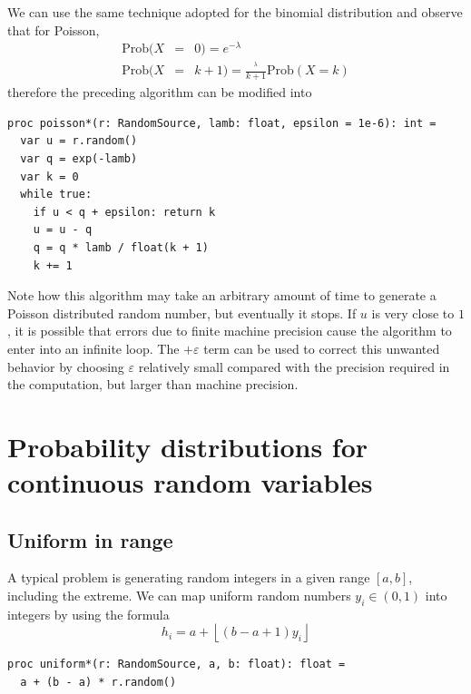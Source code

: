 \documentclass[justified, sixbynine]{tufte-book}
\def\ft{\small\tt}
\theoremstyle{plain}%
\newtheorem * {corollary}{Corollary}
\theoremstyle{definition}
\theoremstyle{remark}
\newtheorem * {remark}{Remark}
\newtheorem * {note}{Note}
\begin{document}
\begin{fullwidth}
We can use the same technique adopted for the
binomial distribution and observe that for Poisson,
\begin{eqnarray}
\textrm{Prob}(X &=&0)=e^{-\lambda } \\
\textrm{Prob}(X &=&k+1)=\frac{^\lambda }{k+1}\textrm{Prob}(X=k)
\end{eqnarray}
therefore the preceding algorithm can be modified into

\begin{lstlisting}[caption={in file: {\ft nlib/randomgen.nim}}]
proc poisson*(r: RandomSource, lamb: float, epsilon = 1e-6): int =
  var u = r.random()
  var q = exp(-lamb)
  var k = 0
  while true:
    if u < q + epsilon: return k
    u = u - q
    q = q * lamb / float(k + 1)
    k += 1
\end{lstlisting}

Note how this algorithm may take an arbitrary amount of time to generate a
Poisson distributed random number, but eventually it stops. If $u$ is very
close to $1$, it is possible that errors due to finite machine precision
cause the algorithm to enter into an infinite loop. The $+\varepsilon $ term
can be used to correct this unwanted behavior by choosing $\varepsilon$ relatively small compared with the precision required in the computation, but
larger than machine precision.

\goodbreak\section{Probability distributions for continuous random variables}

\goodbreak\subsection{Uniform in range}

A typical problem is generating random integers in a given range $[a, b]$,
including the extreme. We can map uniform random numbers $y_i\in (0, 1)$
into integers by using the formula
\begin{equation}
h_i=a+\left\lfloor (b-a+1)y_i\right\rfloor
\end{equation}

\begin{lstlisting}[caption={in file: {\ft nlib/randomgen.nim}}]
proc uniform*(r: RandomSource, a, b: float): float =
  a + (b - a) * r.random()
\end{lstlisting}


\end{fullwidth}
\end{document}

